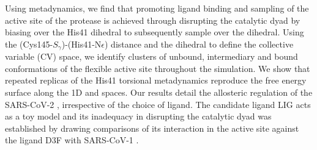 Using metadynamics, we find that promoting ligand binding and sampling of the active site of the protease is achieved through disrupting the catalytic dyad by biasing over the His41 \dihone dihedral to subsequently sample over the \dihtwo dihedral. Using the (Cys145-$S_{\gamma}$)-(His41-N{$\epsilon$}) distance and the \dihtwo dihedral to define the collective variable (CV) space, we identify clusters of unbound, intermediary and bound conformations of the flexible \mpro active site throughout the simulation. We show that repeated replicas of the His41 torsional metadynamics reproduce the free energy surface along the 1D \dihone and \dihtwo spaces. Our results detail the allosteric regulation of the SARS-CoV-2 \mpro\!\!, irrespective of the choice of ligand. The candidate ligand LIG acts as a toy model and its inadequacy in disrupting the catalytic dyad was established by drawing comparisons of its interaction in the \mpro active site against the ligand D3F with SARS-CoV-1 \mpro\!\!.\\

